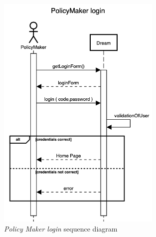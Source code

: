 \begin{enumerate}
\begin{figure}[H]
\begin{center}
        \includegraphics[width=0.7\textwidth]{sequence/PolicyMakerLogin.png}
        \caption{\emph{Policy Maker login} sequence diagram}
        \label{fig:sequence9}
        \end{center}
    \end{figure}


\end{enumerate}
